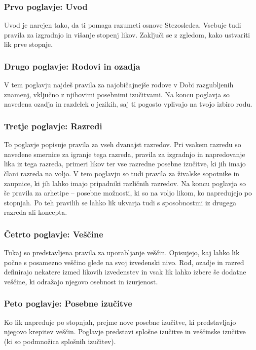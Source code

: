 \subsubsection{Prvo poglavje: Uvod}
Uvod je narejen tako, da ti pomaga razumeti osnove Stezosledca. Vsebuje tudi pravila za izgradnjo in višanje stopenj likov. Zaključi se z zgledom, kako ustvariti lik prve stopnje.

\subsubsection{Drugo poglavje: Rodovi in ozadja}
V tem poglavju najdeš pravila za najobičajnejše rodove v Dobi razgubljenih znamenj, vključno z njihovimi posebnimi izučitvami. Na koncu poglavja so navedena ozadja in razdelek o jezikih, saj ti pogosto vplivajo na tvojo izbiro rodu.

\subsubsection{Tretje poglavje: Razredi}
To poglavje popisuje pravila za vseh dvanajst razredov. Pri vsakem razredu so navedene smernice za igranje tega razreda, pravila za izgradnjo in napredovanje lika iz tega razreda, primeri likov ter vse razredne posebne izučitve, ki jih imajo člani razreda na voljo. V tem poglavju so tudi pravila za živalske sopotnike in zaupnice, ki jih lahko imajo pripadniki različnih razredov. Na koncu poglavja so še pravila za arhetipe -- posebne možnosti, ki so na voljo likom, ko napredujejo po stopnjah. Po teh pravilih se lahko lik ukvarja tudi s sposobnostmi iz drugega razreda ali koncepta.

\subsubsection{Četrto poglavje: Veščine}
Tukaj so predstavljena pravila za uporabljanje veščin. Opisujejo, kaj lahko lik počne s posamezno veščino glede na svoj izvedenski nivo. Rod, ozadje in razred definirajo nekatere izmed likovih izvedenstev in vsak lik lahko izbere še dodatne veščine, ki odražajo njegovo osebnost in izurjenost.

\subsubsection{Peto poglavje: Posebne izučitve}
Ko lik napreduje po stopnjah, prejme nove posebne izučitve, ki predstavljajo njegovo krepitev veščin. Poglavje predstavi splošne izučitve in veščinske izučitve (ki so podmnožica splošnih izučitev).


